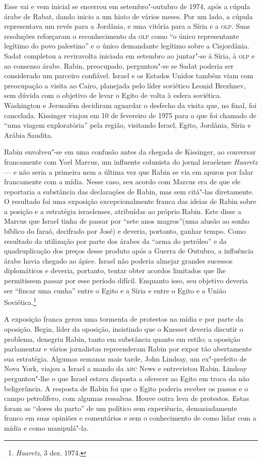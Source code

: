 Esse vai e vem inicial se encerrou em setembro"-outubro de 1974, após a
cúpula árabe de Rabat, dando inicio a um hiato de vários meses. Por um
lado, a cúpula representava um revés para a Jordânia, e uma vitória para
a Síria e a \textsc{olp}. Suas resoluções reforçaram o reconhecimento da \textsc{olp} como
``o único representante legítimo do povo palestino'' e o único
demandante legítimo sobre a Cisjordânia. Sadat completou a reviravolta
iniciada em setembro ao juntar"-se à Síria, à \textsc{olp} e ao consenso árabe.
Rabin, preocupado, perguntou"-se se Sadat poderia ser considerado um
parceiro confiável. Israel e os Estados Unidos também viam com
preocupação a visita ao Cairo, planejada pelo líder soviético Leonid
Brezhnev, sem dúvida com o objetivo de levar o Egito de volta à esfera
soviética. Washington e Jerusalém decidiram aguardar o desfecho da
visita que, no final, foi cancelada. Kissinger viajou em 10 de fevereiro
de 1975 para o que foi chamado de ``uma viagem exploratória'' pela
região, visitando Israel, Egito, Jordânia, Síria e Arábia Saudita.

Rabin envolveu"-se em uma confusão antes da chegada de Kissinger, ao
conversar francamente com Yoel Marcus, um influente colunista do jornal
israelense \emph{Haaretz} --- e não seria a primeira nem a última
vez que Rabin se via em apuros por falar francamente com a mídia.
Nesse caso, seu acordo com Marcus era de que ele reportaria a substância
das declarações de Rabin, mas sem citá"-las diretamente. O resultado foi
uma exposição excepcionalmente franca das ideias de Rabin sobre a
posição e a estratégia israelenses, atribuídas ao próprio Rabin. Este
disse a Marcus que Israel tinha de passar por ``sete anos magros''(uma
alusão ao sonho bíblico do faraó, decifrado por José) e deveria,
portanto, ganhar tempo. Como resultado da utilização por parte dos
árabes da ``arma do petróleo'' e da quadruplicação dos preços desse
produto após a Guerra de Outubro, a influência árabe havia chegado ao
ápice. Israel não poderia almejar grandes sucessos diplomáticos e
deveria, portanto, tentar obter acordos limitados que lhe permitissem
passar por esse período difícil. Enquanto isso, seu objetivo deveria ser
``fincar uma cunha'' entre o Egito e a Síria e entre o Egito e a União
Soviética.\footnote{\emph{Haaretz}, 3 dez. 1974.}

A exposição franca gerou uma tormenta de protestos na mídia e por parte
da oposição. Begin, líder da oposição, insistindo que o Knesset deveria
discutir o problema, denegriu Rabin, tanto em substância quanto em
estilo; a oposição parlamentar e vários jornalistas repreenderam Rabin
por expor tão abertamente sua estratégia. Algumas semanas mais tarde,
John Lindsay, um ex"-prefeito de Nova York, viajou a Israel a mando da
\textsc{abc} News e entrevistou Rabin. Lindsay perguntou"-lhe o que Israel estava
disposta a oferecer ao Egito em troca da não beligerância. A resposta de
Rabin foi que o Egito poderia receber os passos e o campo petrolífero,
com algumas ressalvas. Houve outra leva de protestos. Estas foram as
``dores do parto'' de um político sem experiência, demasiadamente franco
em suas opiniões e comentários e sem o conhecimento de como lidar com a
mídia e como manipulá"-la.

